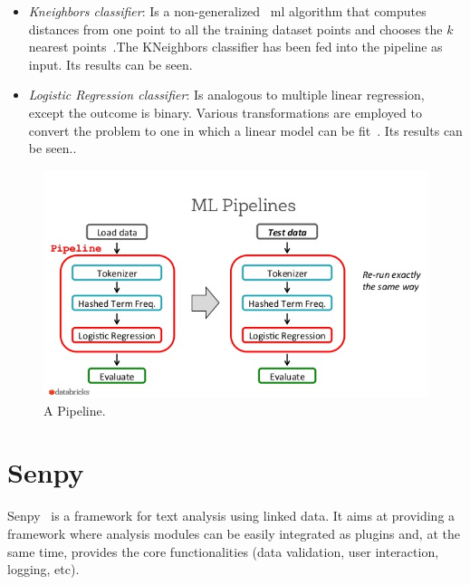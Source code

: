 \begin{itemize}
    \item \textit{Kneighbors classifier}: Is a non-generalized ~\ac{ml} algorithm that computes distances from one point to all the training dataset points and chooses the $k$ nearest points~\cite{knn1}.The KNeighbors classifier has been  fed into the pipeline as input. Its results can be seen.
    \item \textit{Logistic Regression classifier}: Is analogous to multiple linear regression, except the outcome is binary. Various transformations are employed to convert the problem to one in which a linear model can be fit~\cite{lr1}. Its results can be seen..
\end{itemize}

\begin{figure}
  \includegraphics[width=\linewidth]{img/pipeline1.png}
  \caption{A Pipeline.~\cite{pipeline}}
  \label{fig:pipeline}
\end{figure}

\section{Senpy}
Senpy~\cite{senpy} is a framework for text analysis using linked data. It aims at providing a framework where analysis modules can be easily integrated as plugins and, at the same time, provides the core functionalities (data validation, user interaction, logging, etc).

